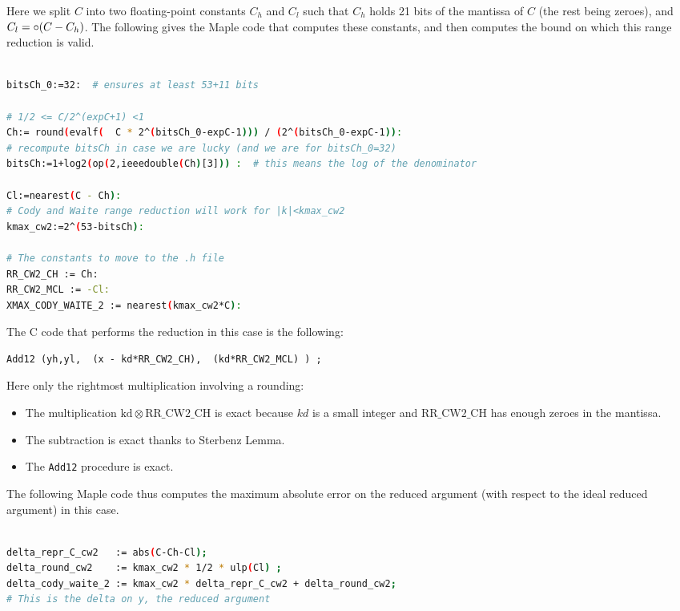Here we split $C$ into two floating-point constants $C_h$ and $C_l$
such that $C_h$ holds 21 bits of the mantissa of $C$ (the rest being
zeroes), and $C_l=\circ(C-C_h)$.  The following gives the
Maple code that computes these constants, and then computes the
bound on which this range reduction is valid.

\begin{lstlisting}[caption={Maple script for computing constants for Cody and Waite 2},
  firstnumber=1,  language={sh}, numbers=none]% of course it's maple
%Skip a line here, I don't know why, otherwise latex eats the first line

bitsCh_0:=32:  # ensures at least 53+11 bits

# 1/2 <= C/2^(expC+1) <1
Ch:= round(evalf(  C * 2^(bitsCh_0-expC-1))) / (2^(bitsCh_0-expC-1)):
# recompute bitsCh in case we are lucky (and we are for bitsCh_0=32)
bitsCh:=1+log2(op(2,ieeedouble(Ch)[3])) :  # this means the log of the denominator

Cl:=nearest(C - Ch):
# Cody and Waite range reduction will work for |k|<kmax_cw2
kmax_cw2:=2^(53-bitsCh):

# The constants to move to the .h file
RR_CW2_CH := Ch:
RR_CW2_MCL := -Cl:
XMAX_CODY_WAITE_2 := nearest(kmax_cw2*C):
\end{lstlisting}

The C code that performs the reduction in this case is the following:

\begin{lstlisting}[caption={Cody and Waite range reduction with two
    constants},firstnumber=31]
	Add12 (yh,yl,  (x - kd*RR_CW2_CH),  (kd*RR_CW2_MCL) ) ;
\end{lstlisting}

Here only the rightmost multiplication involving a rounding: 
\begin{itemize}
\item The multiplication $\mathrm{kd}\otimes \mathrm{RR\_CW2\_CH}$ is
  exact because $kd$ is a small integer and $\mathrm{RR\_CW2\_CH}$
  has enough zeroes in the mantissa.
\item The subtraction is exact thanks to Sterbenz Lemma.
\item The \texttt{Add12} procedure is exact.
\end{itemize}

The following Maple code thus computes the maximum absolute error on
the reduced argument (with respect to the ideal reduced argument) in
this case.
\begin{lstlisting}[caption={Maple script for computing absolute error for Cody and Waite 2},
  firstnumber=1,  language={sh}, numbers=none]% of course it's maple

delta_repr_C_cw2   := abs(C-Ch-Cl);
delta_round_cw2    := kmax_cw2 * 1/2 * ulp(Cl) ;
delta_cody_waite_2 := kmax_cw2 * delta_repr_C_cw2 + delta_round_cw2;
# This is the delta on y, the reduced argument
\end{lstlisting}


